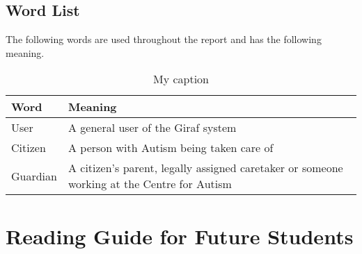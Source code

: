 \subsection{Word List}
The following words are used throughout the report and has the following
meaning.

\begin{table}[H]
\centering
\caption{My caption}
\label{my-label}
\begin{tabular}{|l|l|}
\hline
\textbf{Word} & \textbf{Meaning} \\ \hline
User & A general user of the Giraf system \\ \hline
Citizen & A person with Autism being taken care of \\ \hline
Guardian & A citizen's parent, legally assigned caretaker or someone working
at the Centre for Autism\\ \hline
\end{tabular}
\end{table}


\section{Reading Guide for Future Students}



